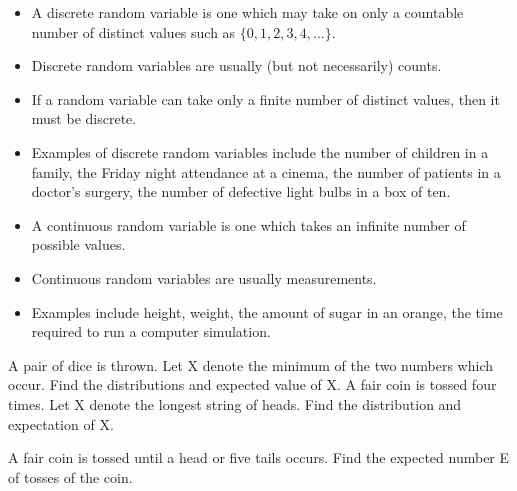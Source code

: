 \documentclass[12pt]{report}
\begin{document}
{{%
{ \Large
	\begin{itemize}
		\item A discrete random variable is one which may take on only a countable number of distinct values such as $\{0, 1, 2, 3, 4, ... \}$.\item Discrete random variables are usually (but not necessarily) counts. \item If a random variable can take only a finite number of distinct values, then it must be discrete. \item Examples of discrete random variables include the number of children in a family, the Friday night attendance at a cinema, the number of patients in a doctor's surgery, the number of defective light bulbs in a box of ten.
	\end{itemize}
}


{ \Large
	\begin{itemize} \item
		A continuous random variable is one which takes an infinite number of possible values. \item Continuous random variables are usually measurements. \item Examples include height, weight, the amount of sugar in an orange, the time required to run a computer simulation. \end{itemize}
	
}
	
	
	A pair of dice is thrown. Let X denote the minimum of the two numbers which occur.
	Find the distributions and expected value of X.
		A fair coin is tossed four times.
	Let X denote the longest string of heads.
	Find the distribution and expectation of X.

A fair coin is tossed until a head or five tails occurs.
	Find the expected number E of tosses of the coin.
	
}}
\end{document}
